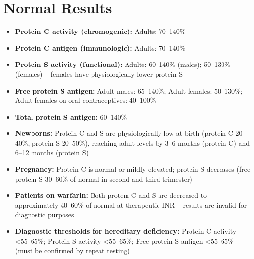 \section*{Normal Results}
\begin{itemize}
  \item \textbf{Protein C activity (chromogenic):} Adults: 70--140\%
  \item \textbf{Protein C antigen (immunologic):} Adults: 70--140\%
  \item \textbf{Protein S activity (functional):} Adults: 60--140\% (males); 50--130\% (females) -- females have physiologically lower protein S
  \item \textbf{Free protein S antigen:} Adult males: 65--140\%; Adult females: 50--130\%; Adult females on oral contraceptives: 40--100\%
  \item \textbf{Total protein S antigen:} 60--140\%
  \item \textbf{Newborns:} Protein C and S are physiologically low at birth (protein C 20--40\%, protein S 20--50\%), reaching adult levels by 3--6 months (protein C) and 6--12 months (protein S)
  \item \textbf{Pregnancy:} Protein C is normal or mildly elevated; protein S decreases (free protein S 30--60\% of normal in second and third trimester)
  \item \textbf{Patients on warfarin:} Both protein C and S are decreased to approximately 40--60\% of normal at therapeutic INR -- results are invalid for diagnostic purposes
  \item \textbf{Diagnostic thresholds for hereditary deficiency:} Protein C activity <55--65\%; Protein S activity <55--65\%; Free protein S antigen <55--65\% (must be confirmed by repeat testing)
\end{itemize}

